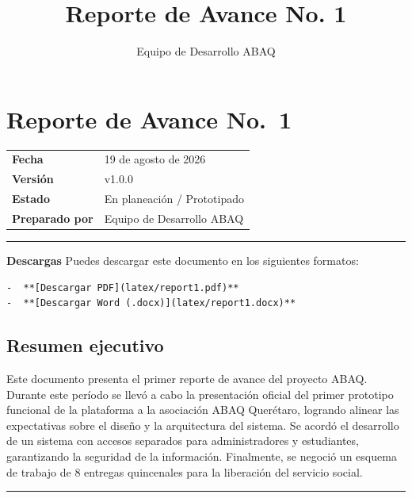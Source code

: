 \documentclass[
]{article}
\title{Reporte de Avance No. 1}
\author{Equipo de Desarrollo ABAQ}
\date{}
\newcounter{none} %
\begin{document}
\maketitle

{
\setcounter{tocdepth}{3}
\tableofcontents
}
\section{Reporte de Avance No.~1}\label{reporte-de-avance-no.-1}

{\def\LTcaptype{none} %
\begin{longtable}[]{@{}ll@{}}
\toprule\noalign{}
\endhead
\bottomrule\noalign{}
\endlastfoot
\textbf{Fecha} & 19 de agosto de 2026 \\
\textbf{Versión} & v1.0.0 \\
\textbf{Estado} & En planeación / Prototipado \\
\textbf{Preparado por} & Equipo de Desarrollo ABAQ \\
\end{longtable}
}

\begin{center}\rule{0.5\linewidth}{0.5pt}\end{center}

\textbf{Descargas} Puedes descargar este documento en los siguientes
formatos:

\begin{verbatim}
-  **[Descargar PDF](latex/report1.pdf)**
-  **[Descargar Word (.docx)](latex/report1.docx)**
\end{verbatim}

\subsection{Resumen ejecutivo}\label{resumen-ejecutivo}

Este documento presenta el primer reporte de avance del proyecto ABAQ.
Durante este período se llevó a cabo la presentación oficial del primer
prototipo funcional de la plataforma a la asociación ABAQ Querétaro,
logrando alinear las expectativas sobre el diseño y la arquitectura del
sistema. Se acordó el desarrollo de un sistema con accesos separados
para administradores y estudiantes, garantizando la seguridad de la
información. Finalmente, se negoció un esquema de trabajo de 8 entregas
quincenales para la liberación del servicio social.

\begin{center}\rule{0.5\linewidth}{0.5pt}\end{center}
\end{document}

